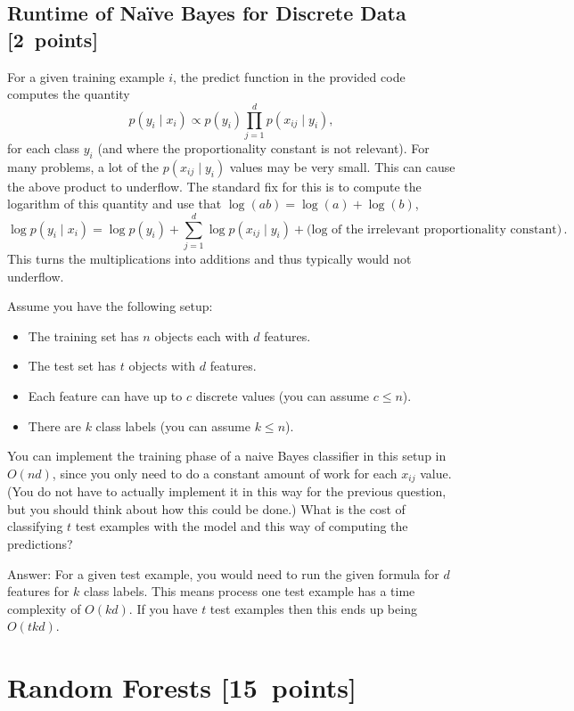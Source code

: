 \documentclass{article}
\newcommand{\blu}[1]{{\textcolor{blu}{#1}}}
\newcommand{\gre}[1]{\textcolor{gre}{#1}}
\newcommand\ans[1]{\par\gre{Answer: #1}}
\let\ask\blu
\newcommand\pts[1]{\textcolor{pointscolour}{[#1~points]}}
\begin{document}
    \clearpage
    \subsection{Runtime of Na\"ive Bayes for Discrete Data \pts{2}}

    For a given training example $i$, the predict function in the provided code computes the quantity
    \[
    p(y_i \mid x_i) \propto p(y_i)\prod_{j=1}^d p(x_{ij} \mid y_i),
    \]
    for each class $y_i$ (and where the proportionality constant is not relevant). For many problems, a lot of the $p(x_{ij} \mid y_i)$ values may be very small. This can cause the above product to underflow. The standard fix for this is to compute the logarithm of this quantity and use that $\log(ab) = \log(a)+\log(b)$,
    \[
    \log p(y_i \mid x_i) = \log p(y_i) + \sum_{j=1}^d \log p(x_{ij} \mid y_i) + \text{(log of the irrelevant proportionality constant)} \, .
    \]
    This turns the multiplications into additions and thus typically would not underflow.

    Assume you have the following setup:
    \begin{itemize}
        \item The training set has $n$ objects each with $d$ features.
        \item The test set has $t$ objects with $d$ features.
        \item Each feature can have up to $c$ discrete values (you can assume $c \leq n$).
        \item There are $k$ class labels (you can assume $k \leq n$).
    \end{itemize}
    You can implement the training phase of a naive Bayes classifier in this setup in $O(nd)$, since you only need to do a constant amount of work for each $x_{ij}$ value. (You do not have to actually implement it in this way for the previous question, but you should think about how this could be done.)
    \ask{What is the cost of classifying $t$ test examples with the model and this way of computing the predictions?}
    
    \ans{For a given test example, you would need to run the given formula for $d$ features for $k$ class labels. This means process one test example has a time complexity of $O(kd)$. If you have $t$ test examples then this ends up being $O(tkd)$.}


    \clearpage
    \section{Random Forests \pts{15}}
\end{document}
